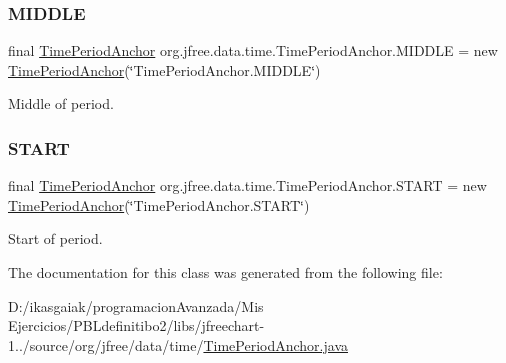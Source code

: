 \subsubsection{\texorpdfstring{M\+I\+D\+D\+LE}{MIDDLE}}
{\footnotesize\ttfamily final \mbox{\hyperlink{classorg_1_1jfree_1_1data_1_1time_1_1_time_period_anchor}{Time\+Period\+Anchor}} org.\+jfree.\+data.\+time.\+Time\+Period\+Anchor.\+M\+I\+D\+D\+LE = new \mbox{\hyperlink{classorg_1_1jfree_1_1data_1_1time_1_1_time_period_anchor}{Time\+Period\+Anchor}}(\char`\"{}Time\+Period\+Anchor.\+M\+I\+D\+D\+LE\char`\"{})\hspace{0.3cm}{\ttfamily [static]}}

Middle of period. \mbox{\label{classorg_1_1jfree_1_1data_1_1time_1_1_time_period_anchor_a0fcc9cde289277369319eb093592fcf7}} 
\subsubsection{\texorpdfstring{S\+T\+A\+RT}{START}}
{\footnotesize\ttfamily final \mbox{\hyperlink{classorg_1_1jfree_1_1data_1_1time_1_1_time_period_anchor}{Time\+Period\+Anchor}} org.\+jfree.\+data.\+time.\+Time\+Period\+Anchor.\+S\+T\+A\+RT = new \mbox{\hyperlink{classorg_1_1jfree_1_1data_1_1time_1_1_time_period_anchor}{Time\+Period\+Anchor}}(\char`\"{}Time\+Period\+Anchor.\+S\+T\+A\+RT\char`\"{})\hspace{0.3cm}{\ttfamily [static]}}

Start of period. 

The documentation for this class was generated from the following file\+:\begin{DoxyCompactItemize}
\item 
D\+:/ikasgaiak/programacion\+Avanzada/\+Mis Ejercicios/\+P\+B\+Ldefinitibo2/libs/jfreechart-\/1../source/org/jfree/data/time/\mbox{\hyperlink{_time_period_anchor_8java}{Time\+Period\+Anchor.\+java}}\end{DoxyCompactItemize}
